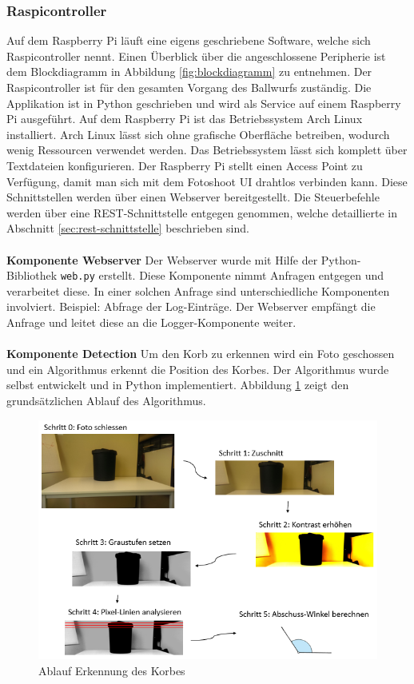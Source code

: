 \subsubsection{Raspicontroller}
Auf dem Raspberry Pi läuft eine eigens geschriebene Software, welche sich Raspicontroller nennt. Einen Überblick über die angeschlossene Peripherie ist dem Blockdiagramm in Abbildung \ref{fig:blockdiagramm} zu entnehmen. Der Raspicontroller ist für den gesamten Vorgang des Ballwurfs zuständig. Die Applikation ist in Python geschrieben und wird als Service auf einem Raspberry Pi ausgeführt. Auf dem Raspberry Pi ist das Betriebssystem Arch Linux installiert. Arch Linux lässt sich ohne grafische Oberfläche betreiben, wodurch wenig Ressourcen verwendet werden. Das Betriebssystem lässt sich komplett über Textdateien konfigurieren. Der Raspberry Pi stellt einen Access Point zu Verfügung, damit man sich mit dem Fotoshoot UI drahtlos verbinden kann. Diese Schnittstellen werden über einen Webserver bereitgestellt. Die Steuerbefehle werden über eine REST-Schnittstelle entgegen genommen, welche detaillierte in Abschnitt \ref{sec:rest-schnittstelle} beschrieben sind. 
\\
\\
\textbf{Komponente Webserver}
Der Webserver wurde mit Hilfe der Python-Bibliothek \texttt{web.py} erstellt. Diese Komponente nimmt Anfragen entgegen und verarbeitet diese. In einer solchen Anfrage sind unterschiedliche Komponenten involviert. Beispiel: Abfrage der Log-Einträge. Der Webserver empfängt die Anfrage und leitet diese an die Logger-Komponente weiter.
\\
\\
\textbf{Komponente Detection}
Um den Korb zu erkennen wird ein Foto geschossen und ein Algorithmus erkennt die Position des Korbes. Der Algorithmus wurde selbst entwickelt und in Python implementiert. Abbildung \ref{fig:ablauf-ortung-des-korbes-algorithmus} zeigt den grundsätzlichen Ablauf des Algorithmus.

\begin{figure}[h!]
	\centering
	\includegraphics[width=0.7\linewidth]{../../fig/ablauf-ortung-des-korbes-algorithmus}
	\caption{Ablauf Erkennung des Korbes}
	\label{fig:ablauf-ortung-des-korbes-algorithmus}
\end{figure}

